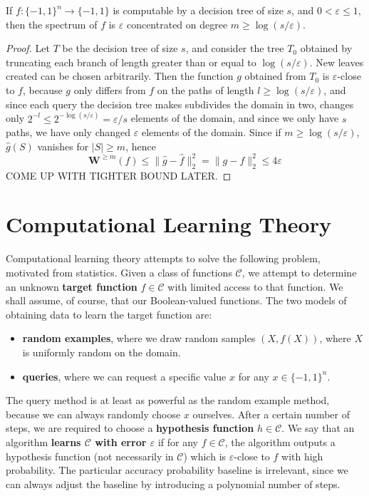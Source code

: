 \begin{theorem}
    If $f: \{ -1, 1 \}^n \to \{ -1, 1 \}$ is computable by a decision tree of size $s$, and $0 < \varepsilon \leq 1$, then the spectrum of $f$ is $\varepsilon$ concentrated on degree $m \geq \log(s/\varepsilon)$.
\end{theorem}
\begin{proof}
    Let $T$ be the decision tree of size $s$, and consider the tree $T_0$ obtained by truncating each branch of length greater than or equal to $\log(s/\varepsilon)$. New leaves created can be chosen arbitrarily. Then the function $g$ obtained from $T_0$ is $\varepsilon$-close to $f$, because $g$ only differs from $f$ on the paths of length $l \geq \log(s/\varepsilon)$, and since each query the decision tree makes subdivides the domain in two, changes only $2^{-l} \leq 2^{-\log(s/\varepsilon)} = \varepsilon/s$ elements of the domain, and since we only have $s$ paths, we have only changed $\varepsilon$ elements of the domain. Since if $m \geq \log(s/\varepsilon)$, $\widehat{g}(S)$ vanishes for $|S| \geq m$, hence
    \[ \mathbf{W}^{\geq m}(f) \leq \| \widehat{g} - \widehat{f} \|_2^2 = \| g - f \|_2^2 \leq 4 \varepsilon \]
    COME UP WITH TIGHTER BOUND LATER.
\end{proof}




\section{Computational Learning Theory}

Computational learning theory attempts to solve the following problem, motivated from statistics. Given a class of functions $\mathcal{C}$, we attempt to determine an unknown {\bf target function} $f \in \mathcal{C}$ with limited access to that function. We shall assume, of course, that our Boolean-valued functions. The two models of obtaining data to learn the target function are:
%
\begin{itemize}
    \item {\bf random examples}, where we draw random samples $(X,f(X))$, where $X$ is uniformly random on the domain.
    \item {\bf queries}, where we can request a specific value $x$ for any $x \in \{ -1, 1 \}^n$.
\end{itemize}
%
The query method is at least as powerful as the random example method, because we can always randomly choose $x$ ourselves. After a certain number of steps, we are required to choose a {\bf hypothesis function} $h \in \mathcal{C}$. We say that an algorithm {\bf learns $\mathcal{C}$ with error $\varepsilon$} if for any $f \in \mathcal{C}$, the algorithm outputs a hypothesis function (not necessarily in $\mathcal{C}$) which is $\varepsilon$-close to $f$ with high probability. The particular accuracy probability baseline is irrelevant, since we can always adjust the baseline by introducing a polynomial number of steps.

